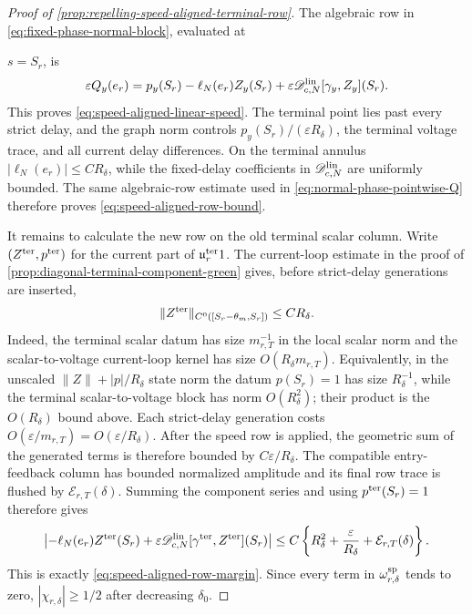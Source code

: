 \begin{proof}[Proof of
\cref{prop:repelling-speed-aligned-terminal-row}]
The algebraic row in \cref{eq:fixed-phase-normal-block}, evaluated at

\(
s=S_r
\), is
\begin{equation*}
 \varepsilon Q_y(e_r)
 =p_y(S_r)-\ell_N(e_r)Z_y(S_r)
   +\varepsilon\mathscr D_{c,N}^{\rm lin}
       [\gamma_y,Z_y](S_r).
\end{equation*}
This proves \cref{eq:speed-aligned-linear-speed}.  The terminal point lies
past every strict delay, and the graph norm controls
\(p_y(S_r)/(\varepsilon R_\delta)\), the terminal voltage trace, and all
current delay differences.  On the terminal annulus
\(
|\ell_N(e_r)|\le CR_\delta
\), while the fixed-delay coefficients in
\(\mathscr D_{c,N}^{\rm lin}\) are uniformly bounded.  The same
algebraic-row estimate used in
\cref{eq:normal-phase-pointwise-Q} therefore proves
\cref{eq:speed-aligned-row-bound}.

It remains to calculate the new row on the old terminal scalar column.
Write
\(
(Z^{\rm ter},p^{\rm ter})
\)
for the current part of
\(
\mathfrak u_r^{\rm ter}1
\).
The current-loop estimate in the proof of
\cref{prop:diagonal-terminal-component-green} gives, before strict-delay
generations are inserted,
\begin{equation}
 \|Z^{\rm ter}\|_{C^0([S_r-\theta_m,S_r])}
 \le CR_\delta .                              \label{eq:proof-speed-row-current-column}
\end{equation}
Indeed, the terminal scalar datum has size
\(
m_{r,T}^{-1}
\)
in the local scalar norm and the scalar-to-voltage current-loop kernel has
size
\(
O(R_\delta m_{r,T})
\).
Equivalently, in the unscaled
\(\|Z\|+|p|/R_\delta\) state norm the datum \(p(S_r)=1\) has size
\(R_\delta^{-1}\), while the terminal scalar-to-voltage block has norm
\(O(R_\delta^2)\); their product is the \(O(R_\delta)\) bound above.
Each strict-delay generation costs
\(
O(\varepsilon/m_{r,T})=O(\varepsilon/R_\delta)
\).  After the speed row is applied, the geometric sum of the generated
terms is therefore bounded by \(C\varepsilon/R_\delta\).  The compatible
entry-feedback column has bounded normalized amplitude and its final row
trace is flushed by
\(
\mathcal E_{r,T}(\delta)
\).
Summing the component series and using
\(
p^{\rm ter}(S_r)=1
\)
therefore gives
\begin{equation}
 \left|
 -\ell_N(e_r)Z^{\rm ter}(S_r)
 +\varepsilon\mathscr D_{c,N}^{\rm lin}
     [\gamma^{\rm ter},Z^{\rm ter}](S_r)
 \right|
 \le C\left\{R_\delta^2+\frac{\varepsilon}{R_\delta}
          +\mathcal E_{r,T}(\delta)\right\}.     \label{eq:proof-speed-row-column-error}
\end{equation}
This is exactly
\cref{eq:speed-aligned-row-margin}.  Since every term in
\(
\omega_{r,\delta}^{\rm sp}
\)
tends to zero, \(|\chi_{r,\delta}|\ge1/2\) after decreasing
\(\delta_0\).


\end{proof}
